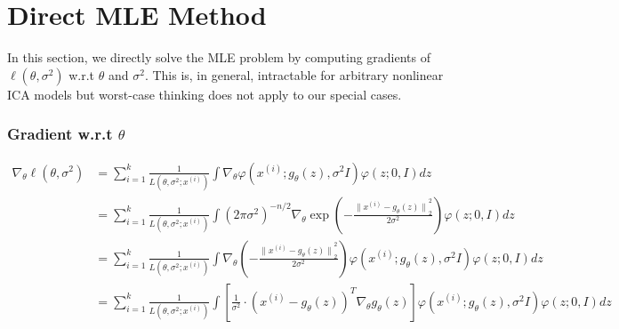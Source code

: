 \section{Direct MLE Method}
In this section, we directly solve the MLE problem by computing gradients of $\ell(\theta, \sigma^{2})$ w.r.t $\theta$ and $\sigma^{2}$. This is, in general, intractable for arbitrary nonlinear ICA models but worst-case thinking does not apply to our special cases.

\subsubsection*{Gradient w.r.t $\theta$}
\begin{equation*}
\begin{aligned}
\nabla_{\theta} \ell(\theta, \sigma^{2}) &= \sum_{i=1}^{k} \frac{1}{L \left(\theta, \sigma^{2}; x^{(i)} \right)} \int \nabla_{\theta} \varphi\left(x^{(i)} ; g_{\theta}(z), \sigma^{2} I\right) \varphi(z ; 0, I) dz \\
&= \sum_{i=1}^{k} \frac{1}{L \left(\theta, \sigma^{2}; x^{(i)} \right)} \int \left(2\pi\sigma^{2}\right)^{-n/2} \nabla_{\theta} \exp \left(-\frac{{\lVert x^{(i)} - g_{\theta}(z) \rVert}_{2}^{2}}{2\sigma^{2}}\right) \varphi(z ; 0, I) dz \\
&= \sum_{i=1}^{k} \frac{1}{L \left(\theta, \sigma^{2}; x^{(i)} \right)} \int \nabla_{\theta} \left(-\frac{{\lVert x^{(i)} - g_{\theta}(z) \rVert}_{2}^{2}}{2\sigma^{2}}\right) \varphi\left(x^{(i)} ; g_{\theta}(z), \sigma^{2} I\right) \varphi(z ; 0, I) dz \\
&= \sum_{i=1}^{k} \frac{1}{L \left(\theta, \sigma^{2}; x^{(i)} \right)} \int \left[\frac{1}{\sigma^{2}} \cdot{\left(x^{(i)} - g_{\theta}(z)\right)^{T} \nabla_{\theta} g_{\theta}(z)}\right] \varphi\left(x^{(i)} ; g_{\theta}(z), \sigma^{2} I\right) \varphi(z ; 0, I) dz \\
\end{aligned}
\end{equation*}


